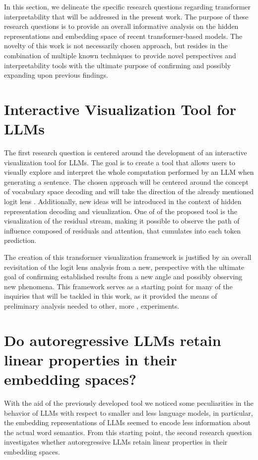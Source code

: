 In this section, we delineate the specific research questions regarding transformer interpretability that will be addressed in the present work.
The purpose of these research questions is to provide an overall informative analysis on the hidden representations and embedding space of recent transformer-based models.
The novelty of this work is not necessarily  chosen approach, but resides in the combination of multiple known techniques to provide novel perspectives and interpretability tools with the ultimate purpose of confirming and possibly expanding upon previous findings.

\section{Interactive Visualization Tool for LLMs}

The first research question is centered around the development of an interactive visualization tool for LLMs.
The goal is to create a tool that allows users to visually explore and interpret the whole computation performed by an LLM when generating a sentence.
The chosen approach will be centered around the concept of vocabulary space decoding and will take the direction of the already mentioned logit lens .
Additionally, new ideas will be introduced in the context of hidden representation decoding and visualization.
One of  of the proposed tool is the visualization of the residual stream, making it possible to observe the path of influence composed of residuals and attention, that cumulates into each token prediction.

The creation of this transformer visualization framework is justified by an overall revisitation of the logit lens analysis from a new,  perspective with the ultimate goal of confirming established results from a new angle and possibly observing new phenomena.
This framework serves as a starting point for many of the inquiries that will be tackled in this work, as it provided the means of preliminary analysis needed to  other, more , experiments.

\section{Do autoregressive LLMs retain linear properties in their embedding spaces?}

With the aid of the previously developed tool we noticed some peculiarities in the behavior of LLMs with respect to smaller and less  language models, in particular, the embedding representations of LLMs seemed to encode less information about the actual word semantics.
From this starting point, the second research question investigates whether autoregressive LLMs retain linear properties in their embedding spaces.

